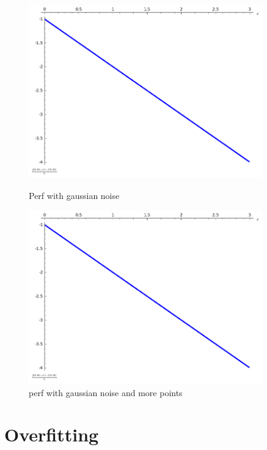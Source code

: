 \documentclass[a4paper]{article}
\begin{document}
\begin{figure}[!ht]
    \centering
    \begin{minipage}{0.45\textwidth}
        \centering
        \includegraphics[width=0.9\textwidth]{illustration1.png} %
        \caption{Perf with gaussian noise}
    \end{minipage}\hfill
    \begin{minipage}{0.45\textwidth}
        \centering
        \includegraphics[width=0.9\textwidth]{illustration1.png} %
        \caption{perf with gaussian noise and more points}
    \end{minipage}
\end{figure}

\section{Overfitting}
\end{document}
